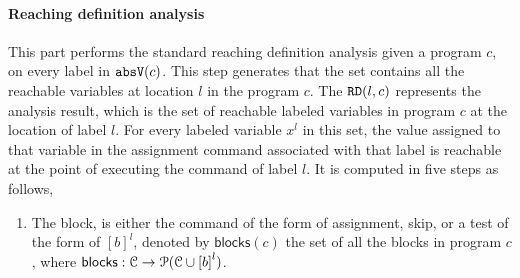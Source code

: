 \paragraph{Reaching definition analysis}
This part performs the standard reaching definition analysis given a program $c$, 
on 
every label in $\mathtt{abs}{\mathtt{V}}(c)$. 
This step generates that the set contains all the reachable variables at location $l$ in the program $c$.
The $\mathtt{RD}(l, c)$ represents the analysis result, which is the set of 
reachable labeled variables in program $c$ at the location of label $l$.
For every labeled variable $x^l$ in this set, 
the value assigned to that variable
in the assignment command associated with that label is reachable at the point of executing the command of label $l$.
It is computed in five steps as follows,
\begin{enumerate}
\item The block, 
is either the command of the form of assignment, skip, or a test of the form of $[b]^{l}$, 
denoted by $\mathsf{blocks}(c)$
the set of all the blocks 
in program $c$, where $\mathsf{blocks}: \cdom \to \mathcal{P}(\cdom \cup \clabel{\bexpr}^{l})$.


\end{enumerate}
